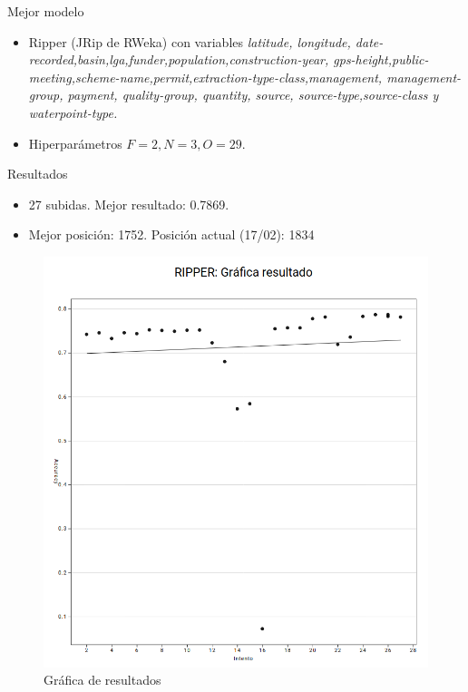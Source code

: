 \begin{frame}{Mejor modelo}
	\begin{itemize}
		\item Ripper (JRip de RWeka) con variables \textit{latitude, longitude, date-recorded,basin,lga,funder,population,construction-year, gps-height,public-meeting,scheme-name,permit,extraction-type-class,management, management-group, payment, quality-group, quantity, source, source-type,source-class y waterpoint-type.}
		\item Hiperparámetros $F=2,N=3, O=29$.
	\end{itemize}
\end{frame}

\begin{frame}{Resultados}
\begin{itemize}
	\item 27 subidas. Mejor resultado: 0.7869.
	\item Mejor posición: 1752. Posición actual (17/02): 1834
\end{itemize}
	\begin{figure}
		\centering
		\includegraphics[scale=0.2]{figures/res-ripper.png}
		\caption{Gráfica de resultados}
	\end{figure}
\end{frame}

